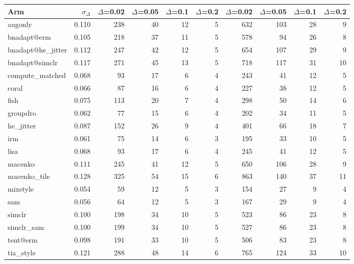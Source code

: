 \begin{tabular}{lrrrrrrrrr}
\toprule
Arm & $\sigma_\Delta$ & $\Delta$=0.02 & $\Delta$=0.05 & $\Delta$=0.1 & $\Delta$=0.2 & $\Delta$=0.02 & $\Delta$=0.05 & $\Delta$=0.1 & $\Delta$=0.2 \\
\midrule
augonly & 0.110 & 238 & 40 & 12 & 5 & 632 & 103 & 28 & 9 \\
bnadapt@erm & 0.105 & 218 & 37 & 11 & 5 & 578 & 94 & 26 & 8 \\
bnadapt@he\_jitter & 0.112 & 247 & 42 & 12 & 5 & 654 & 107 & 29 & 9 \\
bnadapt@simclr & 0.117 & 271 & 45 & 13 & 5 & 718 & 117 & 31 & 10 \\
compute\_matched & 0.068 & 93 & 17 & 6 & 4 & 243 & 41 & 12 & 5 \\
coral & 0.066 & 87 & 16 & 6 & 4 & 227 & 38 & 12 & 5 \\
fish & 0.075 & 113 & 20 & 7 & 4 & 298 & 50 & 14 & 6 \\
groupdro & 0.062 & 77 & 15 & 6 & 4 & 202 & 34 & 11 & 5 \\
he\_jitter & 0.087 & 152 & 26 & 9 & 4 & 401 & 66 & 18 & 7 \\
irm & 0.061 & 75 & 14 & 6 & 3 & 195 & 33 & 10 & 5 \\
lisa & 0.068 & 93 & 17 & 6 & 4 & 245 & 41 & 12 & 5 \\
macenko & 0.111 & 245 & 41 & 12 & 5 & 650 & 106 & 28 & 9 \\
macenko\_tile & 0.128 & 325 & 54 & 15 & 6 & 863 & 140 & 37 & 11 \\
mixstyle & 0.054 & 59 & 12 & 5 & 3 & 154 & 27 & 9 & 4 \\
sam & 0.056 & 64 & 12 & 5 & 3 & 167 & 29 & 9 & 4 \\
simclr & 0.100 & 198 & 34 & 10 & 5 & 523 & 86 & 23 & 8 \\
simclr\_sam & 0.100 & 199 & 34 & 10 & 5 & 527 & 86 & 23 & 8 \\
tent@erm & 0.098 & 191 & 33 & 10 & 5 & 506 & 83 & 23 & 8 \\
tia\_style & 0.121 & 288 & 48 & 14 & 6 & 765 & 124 & 33 & 10 \\
\bottomrule
\end{tabular}

